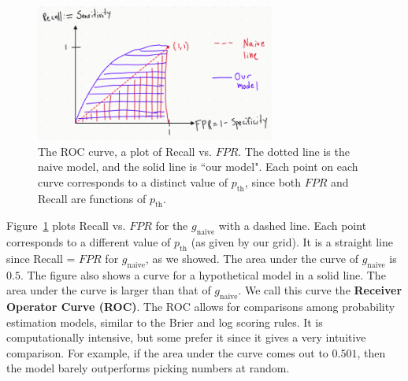 \documentclass[12pt, a4paper]{article}
\theoremstyle{definition}
\begin{document}
	\begin{figure}
		\centering
		\includegraphics[width=0.7\textwidth]{receiver-operator-curve}
		\caption{The ROC curve, a plot of Recall vs. $FPR$. The dotted line is the naive
		model, and the solid line is ``our model". Each point on each curve
		corresponds to a distinct value of $p_{\text{th}}$, since both
		$FPR$ and Recall are functions of $p_{\text{th}}$.}
		\label{fig:receiver-operator-curve}
	\end{figure}
	
	Figure~\ref{fig:receiver-operator-curve} plots Recall vs. $FPR$ for
	the $g_{\text{naive}}$ with a dashed line. Each point corresponds to
	a different value of $p_{\text{th}}$ (as given by our grid). It is
	a straight line since Recall = $FPR$ for $g_{\text{naive}}$, as we
	showed. The area under the curve of $g_{\text{naive}}$ is $0.5$.
	The figure also shows a curve for a hypothetical model in a solid line.
	The area under the curve is larger than that of $g_{\text{naive}}$.
	We call this curve the \textbf{Receiver Operator Curve (ROC)}.
	The ROC allows for comparisons among probability estimation models,
	similar to the Brier and log scoring rules. It is computationally
	intensive, but some prefer it since it gives a very intuitive comparison.
	For example, if the area under the curve comes out to $0.501$, then
	the model barely outperforms picking numbers at random.
	
\end{document}
